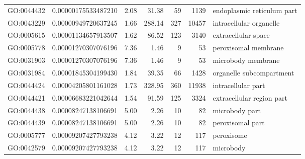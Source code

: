 \documentclass[letterpaper,12pt]{article}
\numberwithin{equation}{appendix}
\begin{document}
\begin{landscape}
{{\begin{longtable}{lrrrrrl}
  GO:0044432 & 0.00000175533487210 & 2.08 & 31.38 & 59 & 1139 & endoplasmic reticulum part \\ 
  GO:0043229 & 0.00000949720637245 & 1.66 & 288.14 & 327 & 10457 & intracellular organelle \\ 
  GO:0005615 & 0.00001134657913507 & 1.62 & 86.52 & 123 & 3140 & extracellular space \\ 
  GO:0005778 & 0.00001270307076196 & 7.36 & 1.46 & 9 & 53 & peroxisomal membrane \\ 
  GO:0031903 & 0.00001270307076196 & 7.36 & 1.46 & 9 & 53 & microbody membrane \\ 
  GO:0031984 & 0.00001845304199430 & 1.84 & 39.35 & 66 & 1428 & organelle subcompartment \\ 
  GO:0044424 & 0.00004205801161028 & 1.73 & 328.95 & 360 & 11938 & intracellular part \\ 
  GO:0044421 & 0.00006683221042644 & 1.54 & 91.59 & 125 & 3324 & extracellular region part \\ 
  GO:0044438 & 0.00008247138106691 & 5.00 & 2.26 & 10 & 82 & microbody part \\ 
  GO:0044439 & 0.00008247138106691 & 5.00 & 2.26 & 10 & 82 & peroxisomal part \\ 
  GO:0005777 & 0.00009207427793238 & 4.12 & 3.22 & 12 & 117 & peroxisome \\ 
  GO:0042579 & 0.00009207427793238 & 4.12 & 3.22 & 12 & 117 & microbody \\ 
   \bottomrule
\end{longtable}
}}
\end{landscape}
\end{document}
